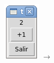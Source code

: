 \documentclass[12pt]{beamer}
\begin{document}
\begin{frame}
\begin{columns}
        \includegraphics[width=\textwidth]{programas/tkinter/capturas/06-2.png}
        \(\longrightarrow\)

\end{columns}
\end{frame}
\end{document}
